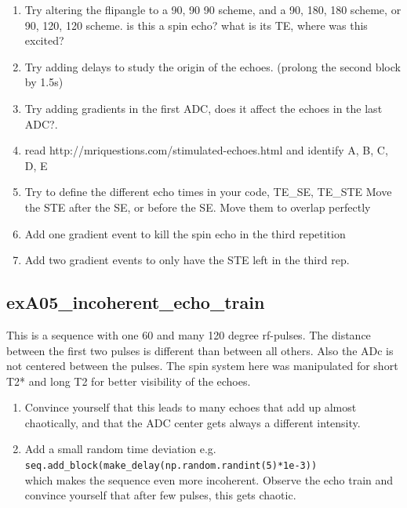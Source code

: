 \documentclass[a4paper,12pt]{extarticle}
\begin{document}
\begin{enumerate}

\item  	Try altering the flipangle to a 90, 90 90 scheme, and a 90, 180, 180 scheme, or 90, 120, 120 scheme. is this a spin echo? what is its TE, where was this excited?

\item 	Try adding delays to study the origin of the echoes. (prolong the second block by 1.5s)
\item 	Try adding gradients in the first ADC, does it affect the echoes in the last ADC?. 
\item 	read  http://mriquestions.com/stimulated-echoes.html  and identify  A, B, C, D, E

\item  	Try to define the different echo times in your code, TE\_SE, TE\_STE
        Move the STE after the SE, or before the SE. Move them to overlap perfectly
\item 	Add one gradient event to kill the spin echo in the third repetition
\item  	Add two gradient events to only have the STE left in the third rep.

\end{enumerate}

\subsection{exA05\_incoherent\_echo\_train}
This is a sequence with one 60 and many 120 degree rf-pulses. The distance between the first two pulses is different than between all others. Also the ADc is not centered between the pulses. The spin system here was manipulated for short T2* and long T2 for better visibility of the echoes.
\begin{enumerate}

\item Convince yourself that this leads to many echoes that add up almost chaotically, and that the ADC center gets always a different intensity. 
\item Add a small random time deviation e.g.\\
\texttt{seq.add_block(make_delay(np.random.randint(5)*1e-3))} \\
which makes the sequence even more incoherent. Observe the echo train and convince yourself that after few pulses, this gets chaotic.
\end{enumerate}
\end{document}
